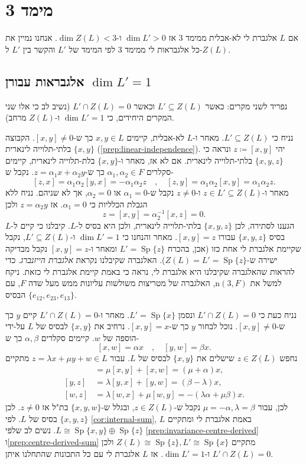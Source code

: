 \documentclass{report}
\theoremstyle{break}
\theoremstyle{MyNonumberbreak}
\DeclareMathOperator{\Sp}{Sp}
\begin{document}
\section{מימד 3}
אם $L$ אלגברת לי לא-אבלית ממימד 3 אז $\dim L' > 0$ ו-$\dim Z(L) < 3$. אנחנו נמיין את כל אלגבראות לי ממימד 3 לפי המימד של $L'$ והקשר בין $L'$ ל-$Z(L)$.

\subsection{אלגבראות עבורן $\dim L' = 1$}
נפריד לשני מקרים: כאשר $L' \subseteq Z(L)$ וכאשר $L' \cap Z(L) = 0$ (נשיב לב כי אלו שני המקרים היחידים, כי $\dim L' = 1$ ו-$Z(L)$ מרחב). 

נניח כי $L' \subseteq Z(L)$. מאחר ו-$L$ לא-אבלית, קיימים $x, y \in L$ כך ש-$[x, y] \neq 0$. הקבוצה $\{x, y\}$ בלתי-תלוייה לינארית (\autoref*{prep:linear-independence}). יהי $z \coloneqq [x, y]$ ונראה כי $\{x, y, z\}$ בלתי-תלוייה לינארית. אם לא אז, מאחר ו-$\{x, y\}$ בלת-תלוייה לינארית, קיימים סקלרים $\alpha_1, \alpha_2 \in F$ כך ש-$z = \alpha_1 x + \alpha_2 y$. נקבל ש-
\[ [z, x] = \alpha_1\alpha_2 [y, x] = -\alpha_1\alpha_2 z \quad , \quad [z, y] = \alpha_1\alpha_2 [x, y] = \alpha_1\alpha_2 z. \]
מאחר ו-$z \in L' \subseteq Z(L)$ ו-$z \neq 0$ נקבל ש-$\alpha_1 = 0$ או $\alpha_2 = 0$, אך לא שניהם. נניח ללא הגבלת הכלליות כי $\alpha_1 = 0$. אז $z = \alpha_2 y$ ולכן
\[ z = [x, y] = \alpha_2^{-1} [x, z] = 0. \]
הגענו לסתירה, לכן $\{x, y, z\}$ בלתי-תלוייה לינארית, ולכן היא בסיס ל-$L$. קיבלנו כי קיים ל-$L$ בסיס $\{x, y, z\}$ עבורו $[x, y] = z$. מאחר והנחנו כי $\dim L' = 1$ ו-$L' \subseteq Z(L)$, נקבל שקיימת אלגברת לי אחת כזו (אכן, בהכרח $L' = \Sp\{z\}$ ומאחר ו-$[x, y] = z$ נקבל מבדיקה ישירה ש-$Z(L) = L' = \Sp\{z\}$). האלגברה שקיבלנו נקראת \textit{אלגברת הייזנברג}. כדי להראות שהאלגברה שקיבלנו היא אלגברת לי, נראה כי באמת קיימת אלגברת לי כזאת. ניקח למשל את $\mathrm{n}(3, F)$, האלגברה של מטריצות משולשות עליונות ממש מעל שדה $F$, עם הבסיס $\{e_{12}, e_{23}, e_{13}\}$.

נניח כעת כי $L' \cap Z(L) = 0$ ונסמן $L' = \Sp\{x\}$. מאחר ו-$L' \cap Z(L) = 0 $ קיים $y$ כך ש-$[x, y] \neq 0$. נוכל לבחור $y$ כך ש-$[x, y] =  x$. נרחיב את $\{x, y\}$ לבסיס של $L$ על-ידי הוספה של $w$. קיימים סקלרים $\alpha, \beta$ כך ש-
\[ [x, w] = \alpha x \quad , \quad [y, w] = \beta x. \]
נחפש $z \in Z(L)$ שישלים את $\{x, y\}$ לבסיס של $L$. עבור $z = \lambda x + \mu y + w \in L$ מתקיים
\begin{align*}
	[x, z] &= \mu [x, y] + [x, w] = (\mu + \alpha)x, \\
	[y, z] &= \lambda [y, x] + [y, w] = (\beta - \lambda)x, \\
	[w, z] &= \lambda [w, x] + \mu [w, y] = -(\lambda\alpha + \mu\beta)x.
\end{align*}
לכן, עבור $\mu = -\alpha, \lambda = \beta$ נקבל ש-$z \in Z(L)$, ובגלל ש-$\{x, y, w\}$ בת"ל אז $z \neq 0$. לכן $\{x, y, z\}$ בסיס של $L$. לפי \autoref*{cor:internal-sum}, $L$ באמת אלגברת לי ומתקיים $L \cong \Sp\{x, y\} \oplus \Sp\{z\}$. נשים לב שלפי \autoref*{prep:invariance-centre-derived} ו\autoref*{prep:centre-derived-sum} מתקיים $Z(L) \cong \Sp\{z\}, L' \cong \Sp\{x\}$ ולכן $L' \cap Z(L) = 0$ ו-$\dim L' = 1$. אז $L$ אלגברת לי עם כל התכונות שהתחלנו איתן.
\end{document}
